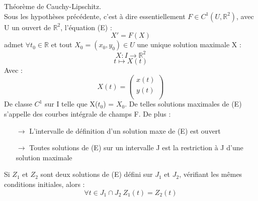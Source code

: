 \begin{theo}
Théorème de Cauchy-Lipschitz.\\
Sous les hypothèses précédente, c'est à dire essentiellement $F \in C^{1}(U,\mathbb{R}^2)$, avec U un ouvert de $\mathbb{R}^2$, l'équation (E) :
$$X' = F(X)$$
admet $\forall t_0 \in \mathbb{R}$ et tout $X_0 = (x_0,y_0) \in U$ une unique solution maximale X : 
$$X : I \rightarrow \mathbb{R}^2$$
$$t \mapsto X(t)$$
Avec : 
$$X(t) = \begin{pmatrix}
  x(t) \\
  y(t) \\
\end{pmatrix}$$
De classe $C^1$ sur I telle que X($t_0$) = $X_0$. De telles solutions maximales de (E) s'appelle des courbes intégrale de champs F. De plus : 
\begin{itemize}
 \item[$\rightarrow$] L'intervalle de définition d'un solution maxe de (E) est ouvert
 \item[$\rightarrow$] Toutes solutions de (E) sur un intervalle J est la restriction à J d'une solution maximale
\end{itemize}
\end{theo}
\begin{coro}
Si $Z_1$ et $Z_2$ sont deux solutions de (E) défini sur $J_1$ et $J_2$, vérifiant les mêmes conditions initiales, alors : 
$$\forall t \in J_1 \cap J_2~ Z_1(t) = Z_2(t) $$
\end{coro}